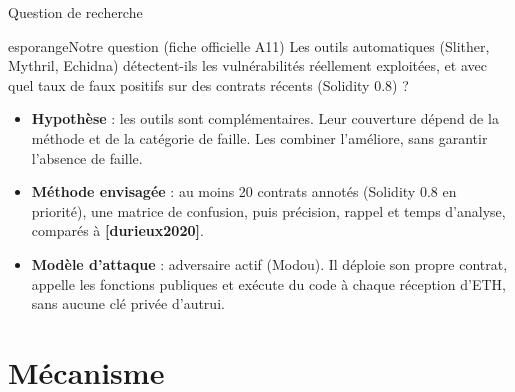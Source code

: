 \documentclass[11pt,aspectratio=169]{beamer}
\newcommand{\refcite}[1]{\textbf{[#1]}}
\begin{document}
\begin{frame}{Question de recherche}
  \begin{bloc}{esporange}{Notre question (fiche officielle A11)}
    Les outils automatiques (Slither, Mythril, Echidna) détectent-ils les vulnérabilités réellement exploitées, et avec quel taux de faux positifs sur des contrats récents (Solidity 0.8) ?
  \end{bloc}
  \footnotesize
  \begin{itemize}
    \item \textbf{Hypothèse} : les outils sont complémentaires. Leur couverture dépend de la méthode et de la catégorie de faille. Les combiner l'améliore, sans garantir l'absence de faille.
    \item \textbf{Méthode envisagée} : au moins 20 contrats annotés (Solidity 0.8 en priorité), une matrice de confusion, puis précision, rappel et temps d'analyse, comparés à \refcite{durieux2020}.
    \item \textbf{Modèle d'attaque} : adversaire actif (Modou). Il déploie son propre contrat, appelle les fonctions publiques et exécute du code à chaque réception d'ETH, sans aucune clé privée d'autrui.
  \end{itemize}
\end{frame}

\section{Mécanisme}
\end{document}
